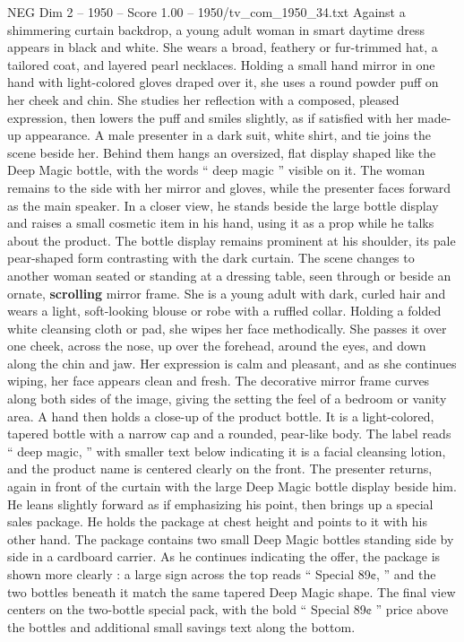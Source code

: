 \begin{textsample}{NEG Dim 2 – 1950 – Score 1.00 – 1950/tv\_com\_1950\_34.txt}  \label{ex:f2_neg_008}
Against a shimmering curtain backdrop, a young adult woman in smart daytime dress appears in black and white.
She wears a broad, feathery or fur-trimmed hat, a tailored coat, and layered pearl necklaces.
Holding a small hand mirror in one hand with light-colored gloves draped over it, she uses a round powder puff on her cheek and chin.
She studies her reflection with a composed, pleased expression, then lowers the puff and smiles slightly, as if satisfied with her made-up appearance.
A male presenter in a dark suit, white shirt, and tie joins the scene beside her.
Behind them hangs an oversized, flat display shaped like the Deep Magic bottle, with the words “ deep magic ” visible on it.
The woman remains to the side with her mirror and gloves, while the presenter faces forward as the main speaker.
In a closer view, he stands beside the large bottle display and raises a small cosmetic item in his hand, using it as a prop while he talks about the product.
The bottle display remains prominent at his shoulder, its pale pear-shaped form contrasting with the dark curtain.
The scene changes to another woman seated or standing at a dressing table, seen through or beside an ornate, \textbf{scrolling} mirror frame.
She is a young adult with dark, curled hair and wears a light, soft-looking blouse or robe with a ruffled collar.
Holding a folded white cleansing cloth or pad, she wipes her face methodically.
She passes it over one cheek, across the nose, up over the forehead, around the eyes, and down along the chin and jaw.
Her expression is calm and pleasant, and as she continues wiping, her face appears clean and fresh.
The decorative mirror frame curves along both sides of the image, giving the setting the feel of a bedroom or vanity area.
A hand then holds a close-up of the product bottle.
It is a light-colored, tapered bottle with a narrow cap and a rounded, pear-like body.
The label reads “ deep magic, ” with smaller text below indicating it is a facial cleansing lotion, and the product name is centered clearly on the front.
The presenter returns, again in front of the curtain with the large Deep Magic bottle display beside him.
He leans slightly forward as if emphasizing his point, then brings up a special sales package.
He holds the package at chest height and points to it with his other hand.
The package contains two small Deep Magic bottles standing side by side in a cardboard carrier.
As he continues indicating the offer, the package is shown more clearly : a large sign across the top reads “ Special 89¢, ” and the two bottles beneath it match the same tapered Deep Magic shape.
The final view centers on the two-bottle special pack, with the bold “ Special 89¢ ” price above the bottles and additional small savings text along the bottom.

\end{textsample}

